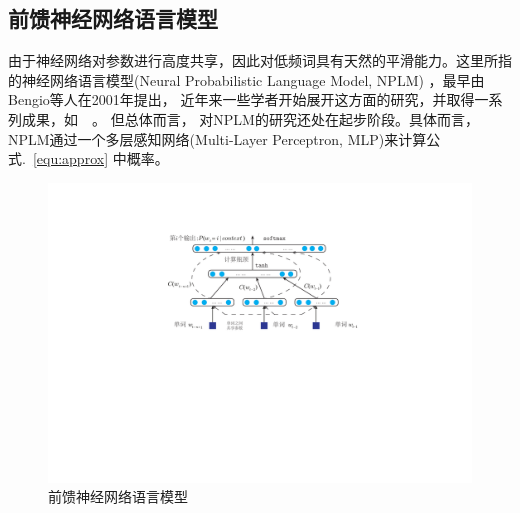 \subsection{前馈神经网络语言模型}
由于神经网络对参数进行高度共享，因此对低频词具有天然的平滑能力。这里所指的神经网络语言模型(Neural Probabilistic Language Model, NPLM) ，最早由Bengio等人在2001年提出， 近年来一些学者开始展开这方面的研究，并取得一系列成果，如~\cite{DBLP:conf/acl/BaroniDK14,DBLP:journals/sigkdd/BellK07,DBLP:journals/pami/BengioCV13,DBLP:journals/tnn/BengioSF94}~。 但总体而言， 对NPLM的研究还处在起步阶段。具体而言，NPLM通过一个多层感知网络(Multi-Layer Perceptron, MLP)来计算公式.~\ref{equ:approx} 中概率。
\begin{figure}
  \centering
  \includegraphics[width=0.8\linewidth]{./figures/nplm.pdf}
  \caption{前馈神经网络语言模型}\label{fig:nplm}
\end{figure}

